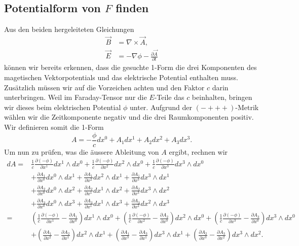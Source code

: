 \subsection{Potentialform von $F$ finden}
Aus den beiden hergeleiteten Gleichungen
\begin{align*}
	\vec{B} &= \nabla \times \vec{A},\\
	\vec{E} &= -\nabla \phi -\frac{\partial \vec{A}}{\partial t}
\end{align*}
können wir bereits erkennen, dass die gesuchte 1-Form die drei Komponenten des magetischen Vektorpotentials und das elektrische Potential enthalten muss.
Zusätzlich müssen wir auf die Vorzeichen achten und den Faktor $c$ darin unterbringen.
Weil im Faraday-Tensor nur die $E$-Teile das $c$ beinhalten, bringen wir dieses beim elektrischen Potential $\phi$ unter.
Aufgrund der $(-+++)$-Metrik wählen wir die Zeitkomponente negativ und die drei Raumkomponenten positiv.
Wir definieren somit die 1-Form 
\begin{equation}
	A = -\frac{\phi}{c}dx^0 + A_1 dx^1 + A_2 dx^2 + A_3 dx^3.
\end{equation}
Um nun zu prüfen, was die äussere Ableitung von $A$ ergibt, rechnen wir
\begin{align*}
	dA = 
	& \frac{1}{c}\frac{\partial (-\phi)}{\partial x^1} dx^1 \wedge dx^0
	+ \frac{1}{c}\frac{\partial (-\phi)}{\partial x^2} dx^2 \wedge dx^0
	+ \frac{1}{c}\frac{\partial (-\phi)}{\partial x^3} dx^3 \wedge dx^0\\
	& + \frac{\partial A_1}{\partial x^0} dx^0 \wedge dx^1
	+ \frac{\partial A_1}{\partial x^2} dx^2 \wedge dx^1
	+ \frac{\partial A_1}{\partial x^3} dx^3 \wedge dx^1\\
	& + \frac{\partial A_2}{\partial x^0} dx^0 \wedge dx^2
	+ \frac{\partial A_2}{\partial x^1} dx^1 \wedge dx^2
	+ \frac{\partial A_2}{\partial x^3} dx^3 \wedge dx^2\\
	& + \frac{\partial A_3}{\partial x^0} dx^0 \wedge dx^3
	+ \frac{\partial A_3}{\partial x^1} dx^1 \wedge dx^3
	+ \frac{\partial A_3}{\partial x^2} dx^2 \wedge dx^3\\[2ex] =
	& \left(\frac{1}{c}\frac{\partial (-\phi)}{\partial x^1}-\frac{\partial A_1}{\partial x^0}\right) dx^1 \wedge dx^0 +
	\left(\frac{1}{c}\frac{\partial (-\phi)}{\partial x^2}-\frac{\partial A_2}{\partial x^0}\right) dx^2 \wedge dx^0 +
	\left(\frac{1}{c}\frac{\partial (-\phi)}{\partial x^3}-\frac{\partial A_3}{\partial x^0}\right) dx^3 \wedge dx^0\\
	& + \left(\frac{\partial A_1}{\partial x^2}-\frac{\partial A_2}{\partial x^1}\right) dx^2 \wedge dx^1 +
	\left(\frac{\partial A_1}{\partial x^3}-\frac{\partial A_3}{\partial x^1}\right) dx^3 \wedge dx^1 +
	\left(\frac{\partial A_2}{\partial x^3}-\frac{\partial A_3}{\partial x^2}\right) dx^3 \wedge dx^2.				
\end{align*}
